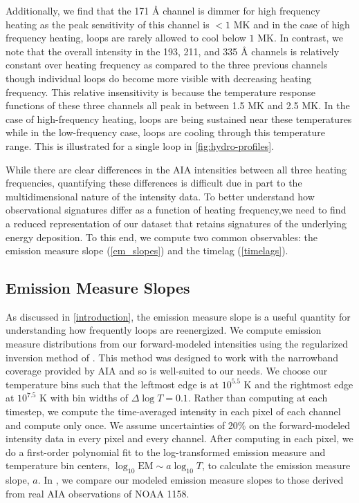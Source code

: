 Additionally, we find that the 171 \AA{} channel is dimmer for high frequency heating as the peak sensitivity of this channel is $<1$ MK and in the case of high frequency heating, loops are rarely allowed to cool below $1$ MK. In contrast, we note that the overall intensity in the 193, 211, and 335 \AA{} channels is relatively constant over heating frequency as compared to the three previous channels though individual loops do become more visible with decreasing heating frequency. This relative insensitivity is because the temperature response functions of these three channels all peak in between 1.5 MK and 2.5 MK. In the case of high-frequency heating, loops are being sustained near these temperatures while in the low-frequency case, loops are cooling through this temperature range. This is illustrated for a single loop in \autoref{fig:hydro-profiles}.

While there are clear differences in the AIA intensities between all three heating frequencies, quantifying these differences is difficult due in part to the multidimensional nature of the intensity data. To better understand how observational signatures differ as a function of heating frequency,we need to find a reduced representation of our dataset that retains signatures of the underlying energy deposition. To this end, we compute two common observables: the emission measure slope (\autoref{em_slopes}) and the timelag (\autoref{timelags}).

\subsection{Emission Measure Slopes}\label{em_slopes}

As discussed in \autoref{introduction}, the emission measure slope is a useful quantity for understanding how frequently loops are reenergized. We compute emission measure distributions from our forward-modeled intensities using the regularized inversion method of \citet{hannah_differential_2012}. This method was designed to work with the narrowband coverage provided by AIA and so is well-suited to our needs. We choose our temperature bins such that the leftmost edge is at $10^{5.5}$ K and the rightmost edge at $10^{7.5}$ K with bin widths of $\Delta\log T=0.1$. Rather than computing \dem{} at each timestep, we compute the time-averaged intensity in each pixel of each channel and compute \dem{} only once. We assume uncertainties of 20\% on the forward-modeled intensity data in every pixel and every channel. After computing \dem{} in each pixel, we do a first-order polynomial fit to the log-transformed emission measure and temperature bin centers, $\log_{10}\mathrm{EM}\sim a\log_{10}T$, to calculate the emission measure slope, $a$. In , we compare our modeled emission measure slopes to those derived from real AIA observations of NOAA 1158.

